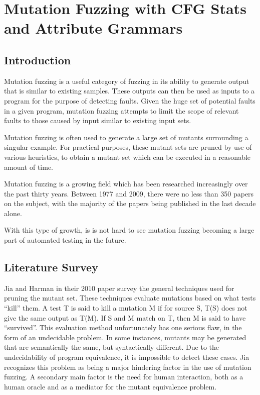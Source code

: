 \section{Mutation Fuzzing with CFG Stats and Attribute Grammars}
\label{mutation}

\subsection{Introduction}
Mutation fuzzing is a useful category of fuzzing in its ability to
generate output that is similar to existing samples. These outputs can
then be used as inputs to a program for the purpose of detecting
faults. Given the huge set of potential faults in a given program,
mutation fuzzing attempts to limit the scope of relevant faults to
those caused by input similar to existing input sets.

Mutation fuzzing is often used to generate a large set of mutants
surrounding a singular example. For practical purposes, these mutant
sets are pruned by use of various heuristics, to obtain a mutant set
which can be executed in a reasonable amount of time.

Mutation fuzzing is a growing field which has been researched
increasingly over the past thirty years. Between 1977 and 2009, there
were no less than 350 papers on the subject, with the majority of the
papers being published in the last decade alone. \cite{Jia2010}

With this type of growth, is is not hard to see mutation fuzzing
becoming a large part of automated testing in the future.

\subsection{Literature Survey}
Jia and Harman in their 2010 paper survey the general techniques used
for pruning the mutant set.\cite{Jia2010} These techniques evaluate
mutations based on what tests ``kill'' them. A test T is said to kill
a mutation M if for source S, T(S) does not give the same output as
T(M). If S and M match on T, then M is said to have ``survived''. This
evaluation method unfortunately has one serious flaw, in the form of
an undecidable problem. In some instances, mutants may be generated
that are semantically the same, but syntactically different. Due to
the undecidability of program equivalence, it is impossible to detect
these cases. Jia recognizes this problem as being a major hindering
factor in the use of mutation fuzzing. A secondary main factor is the
need for human interaction, both as a human oracle and as a mediator
for the mutant equivalence problem.

